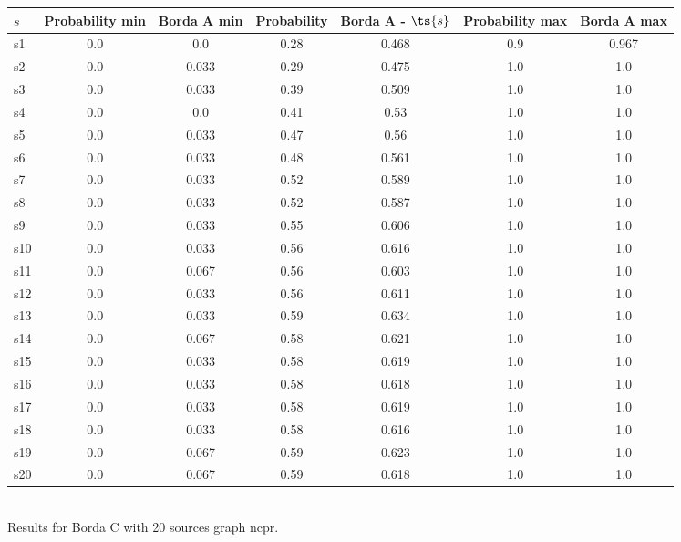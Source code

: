 \documentclass{article}
\begin{document}
\noindent\begin{tabular}{|l|c|c|c|c|c|c|}
\hline
$s$& Probability min & Borda A min & Probability & Borda A - $\ts{s}$ & Probability max & Borda A max\\
\hline
s1 &0.0 & 0.0 & 0.28 & 0.468 & 0.9 & 0.967\\
\hline
s2 &0.0 & 0.033 & 0.29 & 0.475 & 1.0 & 1.0\\
\hline
s3 &0.0 & 0.033 & 0.39 & 0.509 & 1.0 & 1.0\\
\hline
s4 &0.0 & 0.0 & 0.41 & 0.53 & 1.0 & 1.0\\
\hline
s5 &0.0 & 0.033 & 0.47 & 0.56 & 1.0 & 1.0\\
\hline
s6 &0.0 & 0.033 & 0.48 & 0.561 & 1.0 & 1.0\\
\hline
s7 &0.0 & 0.033 & 0.52 & 0.589 & 1.0 & 1.0\\
\hline
s8 &0.0 & 0.033 & 0.52 & 0.587 & 1.0 & 1.0\\
\hline
s9 &0.0 & 0.033 & 0.55 & 0.606 & 1.0 & 1.0\\
\hline
s10 &0.0 & 0.033 & 0.56 & 0.616 & 1.0 & 1.0\\
\hline
s11 &0.0 & 0.067 & 0.56 & 0.603 & 1.0 & 1.0\\
\hline
s12 &0.0 & 0.033 & 0.56 & 0.611 & 1.0 & 1.0\\
\hline
s13 &0.0 & 0.033 & 0.59 & 0.634 & 1.0 & 1.0\\
\hline
s14 &0.0 & 0.067 & 0.58 & 0.621 & 1.0 & 1.0\\
\hline
s15 &0.0 & 0.033 & 0.58 & 0.619 & 1.0 & 1.0\\
\hline
s16 &0.0 & 0.033 & 0.58 & 0.618 & 1.0 & 1.0\\
\hline
s17 &0.0 & 0.033 & 0.58 & 0.619 & 1.0 & 1.0\\
\hline
s18 &0.0 & 0.033 & 0.58 & 0.616 & 1.0 & 1.0\\
\hline
s19 &0.0 & 0.067 & 0.59 & 0.623 & 1.0 & 1.0\\
\hline
s20 &0.0 & 0.067 & 0.59 & 0.618 & 1.0 & 1.0\\
\hline
\end{tabular}\\

\noindent Results for Borda C with 20 sources graph ncpr.
\end{document}
